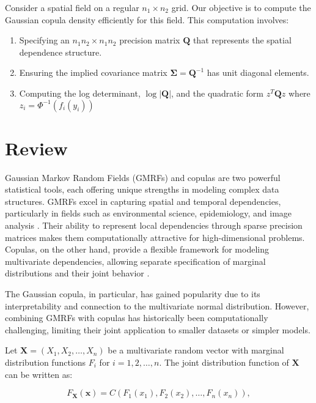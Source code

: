 \documentclass[
  12pt]{article}
\providecommand{\tightlist}{%
  \setlength{\itemsep}{0pt}\setlength{\parskip}{0pt}}\usepackage{longtable,booktabs,array}
\begin{document}
Consider a spatial field on a regular \(n_1 \times n_2\) grid. Our
objective is to compute the Gaussian copula density efficiently for this
field. This computation involves:

\begin{enumerate}
\def\labelenumi{\arabic{enumi}.}
\tightlist
\item
  Specifying an \(n_1 n_2 \times n_1 n_2\) precision matrix
  \(\mathbf{Q}\) that represents the spatial dependence structure.
\item
  Ensuring the implied covariance matrix
  \(\mathbf{\Sigma} = \mathbf{Q}^{-1}\) has unit diagonal elements.
\item
  Computing the log determinant, \(\log |\mathbf Q|\), and the quadratic
  form \(z^T \mathbf Q z\) where \(z_i = \Phi^{-1}(f_i(y_i))\)
\end{enumerate}

\section{Review}\label{review}

Gaussian Markov Random Fields (GMRFs) and copulas are two powerful
statistical tools, each offering unique strengths in modeling complex
data structures. GMRFs excel in capturing spatial and temporal
dependencies, particularly in fields such as environmental science,
epidemiology, and image analysis
\citep{rue2005, knorr-heldBayesianModellingInseparable2000, rue2009}.
Their ability to represent local dependencies through sparse precision
matrices makes them computationally attractive for high-dimensional
problems. Copulas, on the other hand, provide a flexible framework for
modeling multivariate dependencies, allowing separate specification of
marginal distributions and their joint behavior
\citep{sklar1959, joe1997, nelsen2006}.

The Gaussian copula, in particular, has gained popularity due to its
interpretability and connection to the multivariate normal distribution.
However, combining GMRFs with copulas has historically been
computationally challenging, limiting their joint application to smaller
datasets or simpler models.

Let \(\mathbf{X} = (X_1, X_2, \ldots, X_n)\) be a multivariate random
vector with marginal distribution functions \(F_i\) for
\(i = 1, 2, \ldots, n\). The joint distribution function of
\(\mathbf{X}\) can be written as:

\[
F_{\mathbf{X}}(\mathbf{x}) = C(F_1(x_1), F_2(x_2), \ldots, F_n(x_n)),
\]
\end{document}
